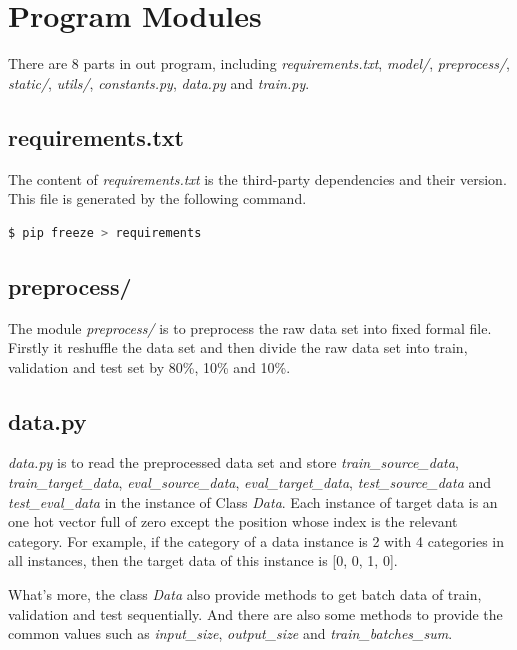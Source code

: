 \section{Program Modules}
\vspace*{-.05in}
There are 8 parts in out program, including \textsl{requirements.txt}, \textsl{model/}, \textsl{preprocess/}, \textsl{static/}, \textsl{utils/}, \textsl{constants.py}, \textsl{data.py} and \textsl{train.py}.

\subsection{requirements.txt}
The content of \textsl{requirements.txt} is the third-party dependencies and their version. This file is generated by the following command.
\begin{lstlisting}[language=bash]
$ pip freeze > requirements
\end{lstlisting}

\subsection{preprocess/}
The module \textsl{preprocess/} is to preprocess the raw data set into fixed formal file. Firstly it reshuffle the data set and then divide the raw data set into train, validation and test set by 80\%, 10\% and 10\%.

\subsection{data.py}
\textsl{data.py} is to read the preprocessed data set and store \textsl{train\_source\_data}, \textsl{train\_target\_data}, \textsl{eval\_source\_data}, \textsl{eval\_target\_data}, \textsl{test\_source\_data} and \textsl{test\_eval\_data} in the instance of Class \textsl{Data}. Each instance of target data is an one hot vector full of zero except the position whose index is the relevant category. For example, if the category of a data instance is 2 with 4 categories in all instances, then the target data of this instance is [0, 0, 1, 0].

What's more, the class \textsl{Data} also provide methods to get batch data of train, validation and test sequentially. And there are also some methods to provide the common values such as \textsl{input\_size}, \textsl{output\_size} and \textsl{train\_batches\_sum}.

